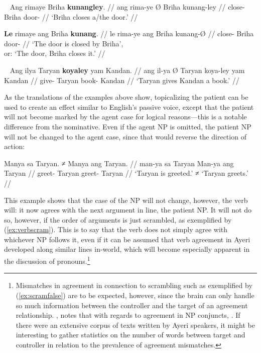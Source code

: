 \xe

\pex~
\a\begingl
	\gla Ang rimaye {} Briha \textbf{kunangley}. //
	\glb ang rima-ye Ø Briha kunang-ley //
	\glc \AgtT{} close-\TsgF{} \Top{} Briha door-\PargI{} //
	\glft `Briha closes a/the door.' //
\endgl

\a\begingl
	\gla \textbf{Le} rimaye ang Briha \textbf{kunang}. //
	\glb le rima-ye ang Briha kunang-Ø //
	\glc \PatTI{} close-\TsgF{} \Aarg{} Briha door-\Top{} //
	\glft `The door is closed by Briha',\\
		or: `The door, Briha closes it.' //
\endgl

\xe

\ex~
\begingl
	\gla Ang ilya {} Taryan \textbf{koyaley} yam Kandan. //
	\glb ang il-ya Ø Taryan koya-ley yam Kandan //
	\glc \AgtT{} give-\TsgM{} \Top{} Taryan book-\PargI{} \Dat{} Kandan //
	\glft `Taryan gives Kandan a book.' //
\endgl

\xe

As the translations of the examples above show, topicalizing the patient can be
used to create an effect similar to English's passive voice, except that the
patient will not become marked by the agent case for logical reasons---this is
a notable difference from the nominative. Even if the agent NP is omitted, the
patient NP will not be changed to the agent case, since that would reverse the
direction of action:

\ex\begingl
	\gla Manya sa Taryan. ≠ Manya ang Taryan. //
	\glb man-ya sa Taryan {} Man-ya ang Taryan //
	\glc greet-\TsgM{} \Parg{} Taryan {} greet-\TsgM{} \Aarg{} Taryan //
	\glft `Taryan is greeted.' ≠ `Taryan greets.' //
\endgl\xe

This example shows that the case of the NP will not change, however, the 
verb will: it now agrees with the next argument in line, the patient NP. It 
will not do so, however, if the order of arguments is just scrambled, as 
exemplified by (\ref{ex:verbscram}). This is to say that the verb does not 
simply agree with whichever NP follows it, even if it can be assumed that verb 
agreement in Ayeri developed along similar lines in-world, which will become 
especially apparent in the discussion of pronouns.\footnote{Mismatches in 
agreement in connection to scrambling such as exemplified by 
(\ref{ex:scramfalse}) are to be expected, however, since the brain can only 
handle so much information between the controller and the target of an 
agreement relationship. \citet{corbett2006}, notes that with regards to 
agreement in NP conjuncts, . If there were an extensive corpus of 
texts written by Ayeri speakers, it might be interesting to gather statistics 
on the number of words between target and controller in relation to the 
prevalence of agreement mismatches.}

